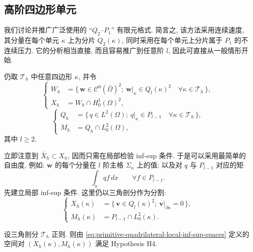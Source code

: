\subsection{高阶四边形单元}
\label{subsec:primitive-quadrilateral-higher-order}

我们讨论并推广广泛使用的 ``$Q_2$--$P_1$'' 有限元格式. 简言之,
该方法采用连续速度, 其分量在每个单元 $\kappa$ 上为分片 $Q_2(\kappa)$,
同时采用在每个单元上分片属于 $P_1$ 的不连续压力. 它的分析相当直接,
而且容易推广到任意阶 $l$, 因此可直接从一般情形开始.

仍取 $\mathcal T_h$ 中任意四边形 $\kappa$, 并令
\begin{equation}\label{eq:primitive-quadrilateral-higher-velocity-spaces}
\left\{
\begin{aligned}
W_h&=\{\,\mathbf w\in\mathcal C^0(\bar\Omega)^2;
\ \mathbf w|_\kappa\in Q_l(\kappa)^2
\quad\forall\kappa\in\mathcal T_h\,\},\\
X_h&=W_h\cap H_0^1(\Omega)^2,
\end{aligned}
\right.
\end{equation}
\begin{equation}\label{eq:primitive-quadrilateral-higher-pressure-spaces}
\left\{
\begin{aligned}
Q_h&=\{\,q\in L^2(\Omega);
\ q|_\kappa\in P_{l-1}\quad\forall\kappa\in\mathcal T_h\,\},\\
M_h&=Q_h\cap L_0^2(\Omega),
\end{aligned}
\right.
\end{equation}
其中 $l\geq2$.

立即注意到 $\bar X_h\subset X_h$, 因而只需在局部检验 inf-sup 条件.
于是可以采用最简单的自由度, 例如: $\mathbf w$ 的每个分量在 $l$ 阶主格
$\Sigma_\kappa$ 上的值; 以及对 $q$ 与 $P_{l-1}$ 对应的矩
\[
\int_\kappa qf\,dx\qquad\forall f\in P_{l-1}.
\]
先建立局部 inf-sup 条件. 这里仍以三角剖分作为分割:
\begin{equation}\label{eq:primitive-quadrilateral-local-inf-sup-spaces}
\left\{
\begin{aligned}
X_h(\kappa)&=\{\,\mathbf v\in Q_l(\kappa)^2;
\ \mathbf v|_{\partial\kappa}=0\,\},\\
M_h(\kappa)&=P_{l-1}\cap L_0^2(\kappa).
\end{aligned}
\right.
\end{equation}

\setcounter{statement}{1}
\renewcommand{\theHstatement}{theorem.\thesection.\arabic{statement}}
\begin{Theorem}\label{thm:primitive-quadrilateral-local-inf-sup}
设三角剖分 $\mathcal T_h$ 正则. 则由
\eqref{eq:primitive-quadrilateral-local-inf-sup-spaces} 定义的空间对
$(X_h(\kappa),M_h(\kappa))$ 满足 Hypothesis H4.
\end{Theorem}

